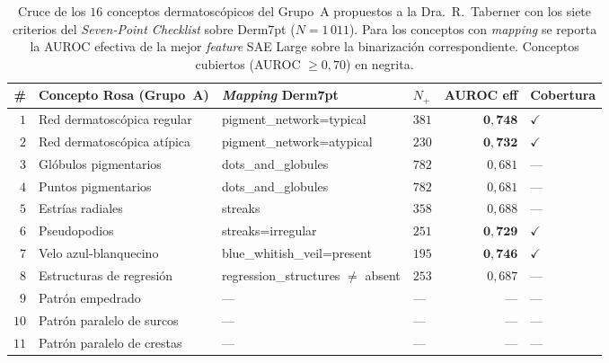 \begin{table}[H]
\centering
\footnotesize
\setlength{\tabcolsep}{4pt}
\renewcommand{\arraystretch}{0.95}
\caption{Cruce de los $16$ conceptos dermatoscópicos del
Grupo~A propuestos a la Dra.~R.~Taberner con los siete criterios del
\emph{Seven-Point Checklist} sobre Derm7pt ($N = 1\,011$).
Para los conceptos con \emph{mapping} se reporta la AUROC efectiva
de la mejor \emph{feature} SAE Large sobre la binarización
correspondiente. Conceptos cubiertos (AUROC $\geq 0{,}70$) en
negrita.}
\label{tab:sae-d7pt-cross-rosa}
\begin{tabular}{rlllrl}
\hline
\# & Concepto Rosa (Grupo~A)                & \emph{Mapping} Derm7pt       & $N_{+}$ & AUROC eff           & Cobertura \\
\hline
$1$  & Red dermatoscópica regular           & pigment\_network=typical            & $381$ & $\mathbf{0{,}748}$  & $\checkmark$ \\
$2$  & Red dermatoscópica atípica           & pigment\_network=atypical           & $230$ & $\mathbf{0{,}732}$  & $\checkmark$ \\
$3$  & Glóbulos pigmentarios                & dots\_and\_globules                 & $782$ & $0{,}681$           & --- \\
$4$  & Puntos pigmentarios                  & dots\_and\_globules                 & $782$ & $0{,}681$           & --- \\
$5$  & Estrías radiales                     & streaks                             & $358$ & $0{,}688$           & --- \\
$6$  & Pseudopodios                         & streaks=irregular                   & $251$ & $\mathbf{0{,}729}$  & $\checkmark$ \\
$7$  & Velo azul-blanquecino                & blue\_whitish\_veil=present         & $195$ & $\mathbf{0{,}746}$  & $\checkmark$ \\
$8$  & Estructuras de regresión             & regression\_structures $\neq$ absent& $253$ & $0{,}687$           & --- \\
$9$  & Patrón empedrado                     & ---                                  & ---   & ---                 & --- \\
$10$ & Patrón paralelo de surcos            & ---                                  & ---   & ---                 & --- \\
$11$ & Patrón paralelo de crestas           & ---                                  & ---   & ---                 & --- \\

\end{tabular}
\end{table}
